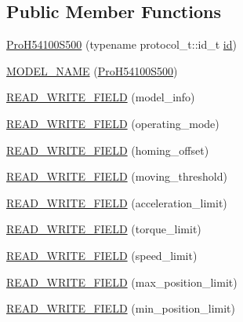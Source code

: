 \subsection*{Public Member Functions}
\begin{DoxyCompactItemize}
\item 
\hyperlink{classdynamixel_1_1servos_1_1_pro_h54100_s500_a99c69a3c500d355d2354516fe861792d}{Pro\+H54100\+S500} (typename protocol\+\_\+t\+::id\+\_\+t \hyperlink{classdynamixel_1_1servos_1_1_servo_a2d022081672e25a7bb57b76706e1cc57}{id})
\item 
\hyperlink{classdynamixel_1_1servos_1_1_pro_h54100_s500_a41724437d3a31f397c38e1c44492d309}{M\+O\+D\+E\+L\+\_\+\+N\+A\+ME} (\hyperlink{classdynamixel_1_1servos_1_1_pro_h54100_s500}{Pro\+H54100\+S500})
\item 
\hyperlink{classdynamixel_1_1servos_1_1_pro_h54100_s500_a0bfef329154d4c3f1dcc30319514ff58}{R\+E\+A\+D\+\_\+\+W\+R\+I\+T\+E\+\_\+\+F\+I\+E\+LD} (model\+\_\+info)
\item 
\hyperlink{classdynamixel_1_1servos_1_1_pro_h54100_s500_a4f98eef90bf4b7619265fed707a78447}{R\+E\+A\+D\+\_\+\+W\+R\+I\+T\+E\+\_\+\+F\+I\+E\+LD} (operating\+\_\+mode)
\item 
\hyperlink{classdynamixel_1_1servos_1_1_pro_h54100_s500_a569a209fea9d8eef2a3b773870962787}{R\+E\+A\+D\+\_\+\+W\+R\+I\+T\+E\+\_\+\+F\+I\+E\+LD} (homing\+\_\+offset)
\item 
\hyperlink{classdynamixel_1_1servos_1_1_pro_h54100_s500_af2bb27779b2bd5c2c9c4d7c5bf7bf86e}{R\+E\+A\+D\+\_\+\+W\+R\+I\+T\+E\+\_\+\+F\+I\+E\+LD} (moving\+\_\+threshold)
\item 
\hyperlink{classdynamixel_1_1servos_1_1_pro_h54100_s500_a00ce49f6231cf810cf5732d3ecb9ca85}{R\+E\+A\+D\+\_\+\+W\+R\+I\+T\+E\+\_\+\+F\+I\+E\+LD} (acceleration\+\_\+limit)
\item 
\hyperlink{classdynamixel_1_1servos_1_1_pro_h54100_s500_a72b5d9f4bbf375476c4ddeb6f084ff4c}{R\+E\+A\+D\+\_\+\+W\+R\+I\+T\+E\+\_\+\+F\+I\+E\+LD} (torque\+\_\+limit)
\item 
\hyperlink{classdynamixel_1_1servos_1_1_pro_h54100_s500_a166a0767d1dd7a52ca32b4c8a694e861}{R\+E\+A\+D\+\_\+\+W\+R\+I\+T\+E\+\_\+\+F\+I\+E\+LD} (speed\+\_\+limit)
\item 
\hyperlink{classdynamixel_1_1servos_1_1_pro_h54100_s500_aacd4a52c191d68be6c98f07a3cded511}{R\+E\+A\+D\+\_\+\+W\+R\+I\+T\+E\+\_\+\+F\+I\+E\+LD} (max\+\_\+position\+\_\+limit)
\item 
\hyperlink{classdynamixel_1_1servos_1_1_pro_h54100_s500_aed2a30272b6bc0fe835b9fdc3da8c7fc}{R\+E\+A\+D\+\_\+\+W\+R\+I\+T\+E\+\_\+\+F\+I\+E\+LD} (min\+\_\+position\+\_\+limit)

\end{DoxyCompactItemize}
